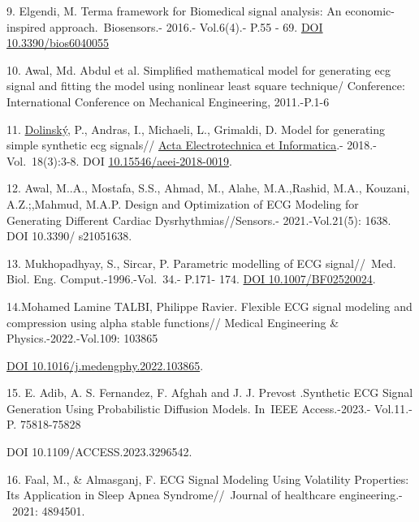 \documentclass[
]{article}
\begin{document}
9. Elgendi, M. Terma framework for Biomedical signal analysis: An
economic-inspired approach.~Biosensors.- 2016.- Vol.6(4).- P.55 - 69.
\href{https://doi.org/10.3390/bios6040055}{DOI 10.3390/bios6040055}

10. Awal, Md. Abdul et al. Simplified mathematical model for generating
ecg signal and fitting the model using nonlinear least square technique/
Conference: International Conference on Mechanical Engineering,
2011.-P.1-6

11.
\href{https://www.researchgate.net/scientific-contributions/Pavol-Dolinsky-2111486589?_sg\%5B0\%5D=OpDWPWB7F-xsKNW7QhdA72wrK8fp7beQ04-y1V0k2OSl-vY7yVCBibx1np_IexfBvwzs1tc.3cwJN3iOVCnhElwMBHi_44SzEhdGHYZWVIVDkbQ1O1b7A14CJ6y-CqFfnB303LWj8pCAkU8V0IFoKmFKiUohPw&_sg\%5B1\%5D=AVFGn2hkG-rhmm2v1aXJV9E-zSTVwesxqk3bJDU_jEY7VSRsfP3brCGDMfFzLd-5yvpDVx0.qPkk_lpV-CUBkVH8P4FChkQpEOFV8sRGeKQiTftWsOp6D_liXpE1YL21VpUyx-lJcgXk9ynFK7DYQ-rBYDhYVA}{Dolinský},
P., Andras, I., Michaeli, L., Grimaldi, D. Model for generating simple
synthetic ecg signals//
\href{https://www.researchgate.net/journal/Acta-Electrotechnica-et-Informatica-1338-3957?_tp=eyJjb250ZXh0Ijp7ImZpcnN0UGFnZSI6InB1YmxpY2F0aW9uIiwicGFnZSI6InB1YmxpY2F0aW9uIiwicG9zaXRpb24iOiJwYWdlSGVhZGVyIn19}{Acta
Electrotechnica et Informatica}.- 2018.-Vol.~18(3):3-8. DOI
\href{http://dx.doi.org/10.15546/aeei-2018-0019}{10.15546/aeei-2018-0019}.

12. Awal, M..A., Mostafa, S.S., Ahmad, M., Alahe, M.A.,Rashid, M.A.,
Kouzani, A.Z.;,Mahmud, M.A.P. Design and Optimization of ECG Modeling
for Generating Different Cardiac Dysrhythmias//Sensors.-
2021.-Vol.21(5): 1638. DOI 10.3390/ s21051638.

13. Mukhopadhyay, S., Sircar, P. Parametric modelling of ECG
signal//~Med. Biol. Eng. Comput.-1996.-Vol.~34.- P.171- 174.
\href{https://doi.org/10.1007/BF02520024}{DOI 10.1007/BF02520024}.

14.Mohamed Lamine TALBI, Philippe Ravier. Flexible ECG signal modeling
and compression using alpha stable functions// Medical Engineering \&
Physics.-2022.-Vol.109: 103865

\href{https://doi.org/10.1016/j.medengphy.2022.103865}{DOI
10.1016/j.medengphy.2022.103865}.

15. E. Adib, A. S. Fernandez, F. Afghah and J. J. Prevost .Synthetic ECG
Signal Generation Using Probabilistic Diffusion Models. In~IEEE
Access.-2023.- Vol.11.- P. 75818-75828

DOI 10.1109/ACCESS.2023.3296542.

16. Faal, M., \& Almasganj, F. ECG Signal Modeling Using Volatility
Properties: Its Application in Sleep Apnea Syndrome//~Journal of
healthcare engineering.-~2021: 4894501.
\end{document}
